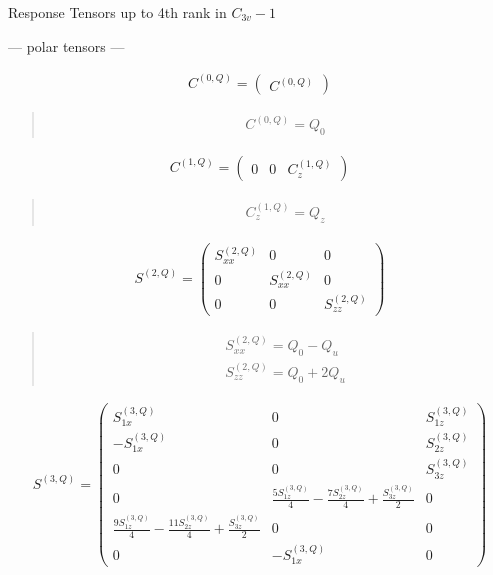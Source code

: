 \documentclass[fleqn,10pt]{jsarticle}
\begin{document}
\setcounter{MaxMatrixCols}{16}

\begin{center}
\LARGE
Response Tensors up to 4th rank in $C_{3v}-1$
\end{center}
\begin{center}\LARGE --- polar tensors ---\end{center}
\begin{align*}
C^{(0,Q)} = \begin{pmatrix} C^{(0,Q)} \end{pmatrix}
\end{align*}
\begin{quote}
\begin{align*}
& C^{(0,Q)} = Q_{0}
\end{align*}
\end{quote}
\begin{align*}
C^{(1,Q)} = \begin{pmatrix} 0 & 0 & C^{(1,Q)}_{z} \end{pmatrix}
\end{align*}
\begin{quote}
\begin{align*}
& C^{(1,Q)}_{z} = Q_{z}
\end{align*}
\end{quote}
\begin{align*}
S^{(2,Q)} = \begin{pmatrix} S^{(2,Q)}_{xx} & 0 & 0 \\ 0 & S^{(2,Q)}_{xx} & 0 \\ 0 & 0 & S^{(2,Q)}_{zz} \end{pmatrix}
\end{align*}
\begin{quote}
\begin{align*}
& S^{(2,Q)}_{xx} = Q_{0} - Q_{u} \\
& S^{(2,Q)}_{zz} = Q_{0} + 2 Q_{u}
\end{align*}
\end{quote}
\begin{align*}
S^{(3,Q)} = \begin{pmatrix} S^{(3,Q)}_{1x} & 0 & S^{(3,Q)}_{1z} \\ - S^{(3,Q)}_{1x} & 0 & S^{(3,Q)}_{2z} \\ 0 & 0 & S^{(3,Q)}_{3z} \\ 0 & \frac{5 S^{(3,Q)}_{1z}}{4} - \frac{7 S^{(3,Q)}_{2z}}{4} + \frac{S^{(3,Q)}_{3z}}{2} & 0 \\ \frac{9 S^{(3,Q)}_{1z}}{4} - \frac{11 S^{(3,Q)}_{2z}}{4} + \frac{S^{(3,Q)}_{3z}}{2} & 0 & 0 \\ 0 & - S^{(3,Q)}_{1x} & 0 \end{pmatrix}
\end{align*}
\end{document}
